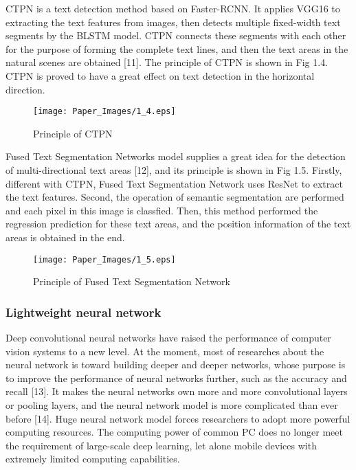 \documentclass[22pt, UTF8]{article}
\numberwithin{figure}{section}
\numberwithin{table}{section}
\numberwithin{equation}{section} %
\begin{document}
\setlength\parindent{2em} CTPN is a text detection method based on Faster-RCNN. It applies VGG16 to extracting the text features from images, then detects multiple fixed-width text segments by the BLSTM model. CTPN connects these segments with each other for the purpose of forming the complete text lines, and then the text areas in the natural scenes are obtained [11]. The principle of CTPN is shown in Fig 1.4. CTPN is proved to have a great effect on text detection in the horizontal direction.

\begin{figure}[htbp]
    \begin{center}
        \texttt{[image: Paper\_Images/1\_4.eps]}
    \end{center}
    \vspace{-3mm} %
    \caption{Principle of CTPN}
    \vspace{-4mm} %
\end{figure}

\setlength\parindent{2em} Fused Text Segmentation Networks model supplies a great idea for the detection of multi-directional text areas [12], and its principle is shown in Fig 1.5. Firstly, different with CTPN, Fused Text Segmentation Network uses ResNet to extract the text features. Second, the operation of semantic segmentation are performed and each pixel in this image is classfied. Then, this method performed the regression prediction for these text areas, and the position information of the text areas is obtained in the end.

\begin{figure}[htbp]
    \begin{center}
        \texttt{[image: Paper\_Images/1\_5.eps]}
    \end{center}
    \vspace{-3mm} %
    \caption{Principle of Fused Text Segmentation Network}
    \vspace{-4mm} %
\end{figure}

\subsubsection{Lightweight neural network}

\setlength\parindent{2em} Deep convolutional neural networks have raised the performance of computer vision systems to a new level. At the moment, most of researches about the neural network is toward building deeper and deeper networks, whose purpose is to improve the performance of neural networks further, such as the accuracy and recall [13]. It makes the neural networks own more and more convolutional layers or pooling layers, and the neural network model is more complicated than ever before [14]. Huge neural network model forces researchers to adopt more powerful computing resources. The computing power of common PC does no longer meet the requirement of large-scale deep learning, let alone mobile devices with extremely limited computing capabilities.
\end{document}
